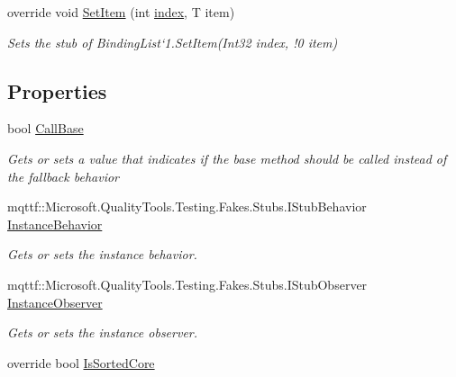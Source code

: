 \begin{DoxyCompactItemize}
override void \hyperlink{class_system_1_1_component_model_1_1_fakes_1_1_stub_binding_list_3_01_t_01_4_a9bcb034e1c61c23571d8cba88466bec1}{Set\-Item} (int \hyperlink{jquery-1_810_82-vsdoc_8js_a75bb12d1f23302a9eea93a6d89d0193e}{index}, T item)
\begin{DoxyCompactList}\small\item\em Sets the stub of Binding\-List`1.Set\-Item(Int32 index, !0 item)\end{DoxyCompactList}\end{DoxyCompactItemize}
\subsection*{Properties}
\begin{DoxyCompactItemize}
\item 
bool \hyperlink{class_system_1_1_component_model_1_1_fakes_1_1_stub_binding_list_3_01_t_01_4_a1b70d02104a2c45f3fbef275e275da99}{Call\-Base}
\begin{DoxyCompactList}\small\item\em Gets or sets a value that indicates if the base method should be called instead of the fallback behavior\end{DoxyCompactList}\item 
mqttf\-::\-Microsoft.\-Quality\-Tools.\-Testing.\-Fakes.\-Stubs.\-I\-Stub\-Behavior \hyperlink{class_system_1_1_component_model_1_1_fakes_1_1_stub_binding_list_3_01_t_01_4_a652c677a19e7f29b96d40663c845df57}{Instance\-Behavior}
\begin{DoxyCompactList}\small\item\em Gets or sets the instance behavior.\end{DoxyCompactList}\item 
mqttf\-::\-Microsoft.\-Quality\-Tools.\-Testing.\-Fakes.\-Stubs.\-I\-Stub\-Observer \hyperlink{class_system_1_1_component_model_1_1_fakes_1_1_stub_binding_list_3_01_t_01_4_a7ed54976963e4f7f3ddd7f4910ec181a}{Instance\-Observer}
\begin{DoxyCompactList}\small\item\em Gets or sets the instance observer.\end{DoxyCompactList}\item 
override bool \hyperlink{class_system_1_1_component_model_1_1_fakes_1_1_stub_binding_list_3_01_t_01_4_ae6ffe167e76245a7e2af08f3d26597f0}{Is\-Sorted\-Core}

\end{DoxyCompactItemize}
